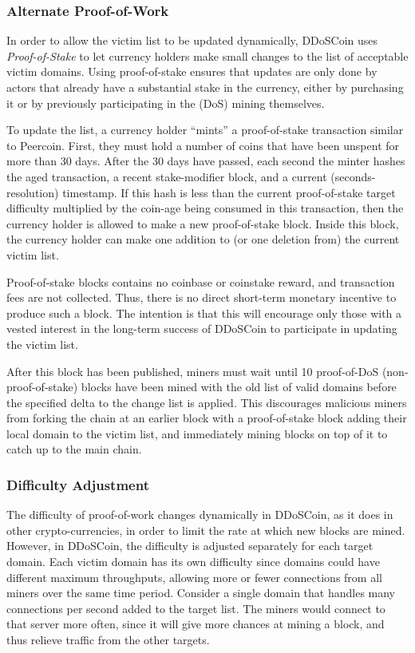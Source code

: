 \subsubsection{Alternate Proof-of-Work}

In order to allow the victim list to be updated dynamically, DDoSCoin uses
\emph{Proof-of-Stake} to let currency holders make small changes to the list of
acceptable victim domains. Using proof-of-stake ensures that updates are only
done by actors that already have a substantial stake in the currency, either by
purchasing it or by previously participating in the (DoS) mining themselves.

To update the list, a currency holder ``mints'' a proof-of-stake transaction
similar to Peercoin. First, they must hold a number of coins that have been
unspent for more than 30 days. After the 30 days have passed, each second the
minter
hashes the aged transaction, a recent stake-modifier block, and a current
(seconds-resolution) timestamp. If this hash is less than the current
proof-of-stake target difficulty multiplied by the coin-age being consumed in
this transaction, then the currency holder is allowed to make a new
proof-of-stake block. Inside this block, the currency holder can make one
addition to (or one deletion from) the current victim list.

Proof-of-stake blocks contains no coinbase or coinstake reward, and transaction
fees are not collected. Thus, there is no direct short-term monetary incentive
to produce such a block. The intention is that this will encourage only those
with a vested interest in the long-term success of DDoSCoin to participate in
updating the victim list.

After this block has been published, miners must wait until 10 proof-of-DoS
(non-proof-of-stake) blocks have been mined with the old list of valid domains
before the specified delta to the change list is applied. This discourages
malicious miners from forking the chain at an earlier block with a
proof-of-stake block adding their local domain to the victim list, and
immediately mining blocks on top of it to catch up to the main chain.


\subsubsection{Difficulty Adjustment}

The difficulty of proof-of-work changes dynamically in DDoSCoin, as it does in
other crypto-currencies, in order to limit the rate at which new blocks are mined.
However, in DDoSCoin, the difficulty is adjusted separately for each target domain. 
Each victim domain has its own difficulty since domains could have different maximum throughputs, 
allowing more or fewer connections from all miners over the same time period. Consider
a single domain that handles many connections per second added to the target list. 
The miners would connect to that server more often, since it will give more chances 
at mining a block, and thus relieve traffic from the other targets.

